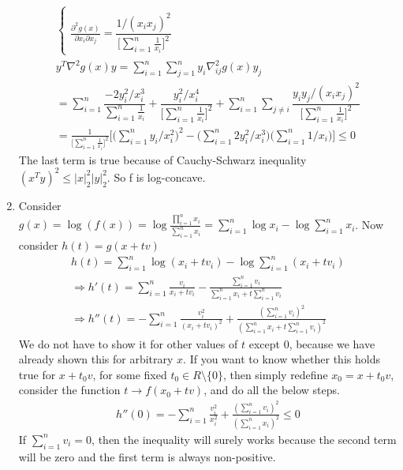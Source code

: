 \begin{latin}
\begin{enumerate}
\begin{gather*}
\begin{cases}
			\\
			\frac{\partial^{2} g(x)}{\partial x_{i} \partial x_{j}} = \dfrac{1/(x_{i}x_{j})^{2}}{\bigg[\sum_{i=1}^{n} \frac{1}{x_{i}}\bigg]^{2}}
		\end{cases}
		\\
		y^{T} \nabla^{2}g(x) y = \sum_{i=1}^{n} \sum_{j=1}^{n} y_{i} \nabla^{2}_{ij} g(x) y_{j} 
		\\
		= \sum_{i=1}^{n} \dfrac{-2 y_{i}^{2} /x_{i}^{3}}{\sum_{i=1}^{n} \frac{1}{x_{i}}} + \dfrac{y_{i}^{2}/x_{i}^{4}}{\bigg[\sum_{i=1}^{n} \frac{1}{x_{i}}\bigg]^{2}} 
		+ 
		\sum_{i=1}^{n} \sum_{j \neq i} \dfrac{y_{i} y_{j}/(x_{i}x_{j})^{2}}{\bigg[\sum_{i=1}^{n} \frac{1}{x_{i}}\bigg]^{2}}
		\\
		= \frac{1}{\bigg[\sum_{i=1}^{n} \frac{1}{x_{i}}\bigg]^{2}} \bigg[ \big(\sum_{i=1}^{n}y_{i}/x_{i}^{2}\big)^{2} -  \big(\sum_{i=1}^{n}2y_{i}^{2}/x_{i}^{3}\big)
		\big(\sum_{i=1}^{n}1/x_{i}\big)
		\bigg] \leq 0
	\end{gather*}
	The last term is true because of Cauchy-Schwarz inequality $ (x^{T} y)^{2} \leq |x|_{2}^{2} |y|_{2}^{2} $. So f is log-concave.
	\item 
	Consider $ g(x) = \log (f(x)) =  \log \frac{\prod_{i=1}^{n} x_{i}}{\sum_{i=1}^{n} x_{i}}  = \sum_{i=1}^{n} \log x_{i} - \log \sum_{i=1}^{n} x_{i} $. Now consider $ h(t) = g(x + tv) $ 
	\begin{gather*}
		h(t) = \sum_{i=1}^{n} \log (x_{i}+tv_{i}) - \log \sum_{i=1}^{n} (x_{i}+tv_{i})
		\\
		\Rightarrow h'(t) = \sum_{i=1}^{n} \frac{v_{i}}{x_{i}+tv_{i}} - \frac{\sum_{i=1}^{n}v_{i}}{\sum_{i=1}^{n}x_{i} + t\sum_{i=1}^{n}v_{i}}
		\\
		\Rightarrow h''(t) = - \sum_{i=1}^{n} \frac{v_{i}^{2}}{(x_{i}+tv_{i})^{2}} + \frac{(\sum_{i=1}^{n}v_{i})^{2}}{(\sum_{i=1}^{n}x_{i} + t\sum_{i=1}^{n}v_{i})^{2}} 
	\end{gather*}
	We do not have to show it for other values of $ t $ except $ 0 $, because we have already shown this for arbitrary $ x $. If you want to know whether this holds true for $ x+t_{0}v $, for some fixed $ t_{0} \in R \setminus \{0\} $, then simply redefine $ x_{0}=x+t_{0}v $, consider the function $ t \to f(x_{0}+tv) $, and do all the below steps.
	\begin{gather*}
		h''(0) = - \sum_{i=1}^{n} \frac{v_{i}^{2}}{x_{i}^{2}} + \frac{(\sum_{i=1}^{n}v_{i})^{2}}{(\sum_{i=1}^{n}x_{i})^{2}} \leq 0 
	\end{gather*}
	If $ \sum_{i=1}^{n}v_{i} = 0 $, then the inequality will surely works because the  second term will be zero and the first term is always non-positive.

\end{enumerate}
\end{latin}
